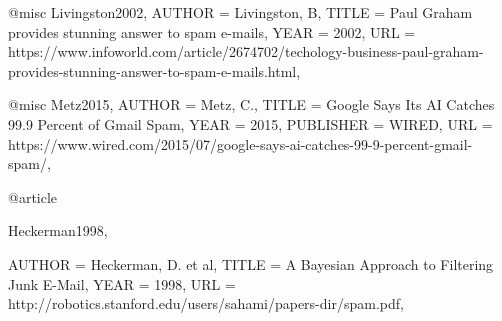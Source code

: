 


@misc {Livingston2002,
AUTHOR = {Livingston, B},
TITLE = {Paul Graham provides stunning answer to spam e-mails},
YEAR = {2002},
URL = {https://www.infoworld.com/article/2674702/techology-business-paul-graham-provides-stunning-answer-to-spam-e-mails.html}, 
}

@misc {Metz2015,
AUTHOR = {Metz, C.},
TITLE = {Google Says Its AI Catches 99.9 Percent of Gmail Spam},
YEAR = {2015},
PUBLISHER = {WIRED},
URL = {https://www.wired.com/2015/07/google-says-ai-catches-99-9-percent-gmail-spam/},
}

@article {Heckerman1998,

AUTHOR = {Heckerman, D. et al},
TITLE = {A Bayesian Approach to Filtering Junk E-Mail},
YEAR = {1998},
URL = {http://robotics.stanford.edu/users/sahami/papers-dir/spam.pdf},
}
